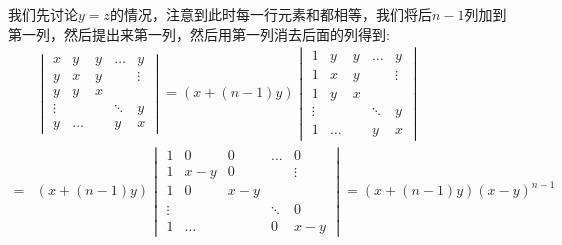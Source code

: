\documentclass[a4paper,12pt]{ctexart}
\newenvironment{prooff}{{\noindent\it\textcolor{cyan!40!black}{Proof}:}\quad}{\par}
\begin{document}
\begin{prooff}
    我们先讨论$y=z$的情况，注意到此时每一行元素和都相等，我们将后$n-1$列加到第一列，然后提出来第一列，然后用第一列消去后面的列得到:
    \begin{align*}
          & \begin{vmatrix}
            x      & y     & y & \dots  & y      \\
            y      & x     & y &        & \vdots \\
            y      & y     & x &        &        \\
            \vdots &       &   & \ddots & y      \\
            y      & \dots &   & y      & x
        \end{vmatrix}  =(x+(n-1)y)\begin{vmatrix}
            1      & y     & y & \dots  & y      \\
            1      & x     & y &        & \vdots \\
            1      & y     & x &        &        \\
            \vdots &       &   & \ddots & y      \\
            1      & \dots &   & y      & x
        \end{vmatrix} \\
        = & (x+(n-1)y)\begin{vmatrix}
            1      & 0     & 0   & \dots  & 0      \\
            1      & x-y   & 0   &        & \vdots \\
            1      & 0     & x-y &        &        \\
            \vdots &       &     & \ddots & 0      \\
            1      & \dots &     & 0      & x-y
        \end{vmatrix}
        =(x+(n-1)y)(x-y)^{n-1}
    \end{align*}


\end{prooff}
\end{document}
